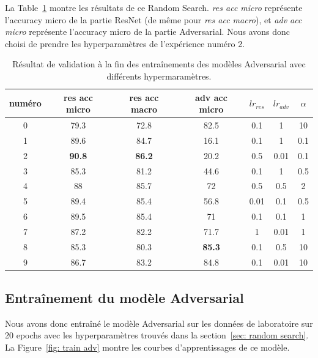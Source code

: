 \documentclass[a4paper]{article}
\begin{document}
La Table~\ref{tab:random search results} montre les résultats de ce Random Search. \textit{res acc micro} représente l'accuracy micro de la partie ResNet (de même pour \textit{res acc macro}), et \textit{adv acc micro} représente l'accuracy micro de la partie Adversarial. Nous avons donc choisi de prendre les hyperparamètres de l'expérience numéro 2.

\begin{table}[ht]
    \centering
    \begin{tabular}{ccccccc}
    \toprule
    numéro & res acc micro & res acc macro & adv acc micro & $lr_{res}$ & $lr_{adv}$ & $\alpha$ \\
    \midrule
    0 & 79.3 & 72.8 & 82.5 & 0.1 & 1 & 10 \\
    1 & 89.6 & 84.7 & 16.1 & 0.1 & 1 & 0.1 \\
    2 & \textbf{90.8} & \textbf{86.2} & 20.2 & 0.5 & 0.01 & 0.1 \\
    3 & 85.3 & 81.2 & 44.6 & 0.1 & 1 & 0.5 \\
    4 & 88 & 85.7 & 72 & 0.5 & 0.5 & 2 \\
    5 & 89.4 & 85.4 & 56.8 & 0.01 & 0.1 & 0.5 \\
    6 & 89.5 & 85.4 & 71 & 0.1 & 0.1 & 1 \\
    7 & 87.2 & 82.2 & 71.7 & 1 & 0.01 & 1 \\
    8 & 85.3 & 80.3 & \textbf{85.3} & 0.1 & 0.5 & 10 \\
    9 & 86.7 & 83.2 & 84.8 & 0.1 & 0.01 & 10 \\
    \bottomrule
    \end{tabular}
    \caption{Résultat de validation à la fin des entraînements des modèles Adversarial avec différents hypermaramètres.}
    \label{tab:random search results}
\end{table}

\subsection{Entraînement du modèle Adversarial}
Nous avons donc entraîné le modèle Adversarial sur les données de laboratoire sur 20 epochs avec les hyperparamètres trouvés dans la section~\ref{sec: random search}. La Figure~\ref{fig: train adv} montre les courbes d'apprentissages de ce modèle.
\end{document}
